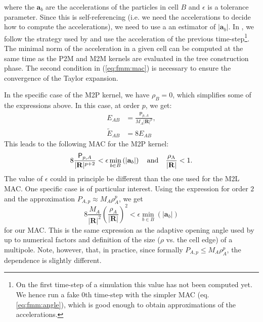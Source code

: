 where the $\mathbf{a}_b$ are the accelerations of the particles in cell $B$
and $\epsilon$ is a tolerance parameter. Since this is self-referencing
(i.e. we need the accelerations to decide how to compute the
accelerations), we need to use a an estimator of $|\mathbf{a}_b|$. In
\swift, we follow the strategy used by \gadget and use the acceleration of
the previous time-step\footnote{On the first time-step of a simulation this
  value has not been computed yet. We hence run a fake 0th time-step with
  the simpler MAC (eq. \ref{eq:fmm:angle}), which is good enough to obtain
  approximations of the accelerations.}. The minimal norm of the
acceleration in a given cell can be computed at the same time as the P2M
and M2M kernels are evaluated in the tree construction phase. The second
condition in (\ref{eq:fmm:mac}) is necessary to ensure the convergence of the
Taylor expansion.

In the specific case of the M2P kernel, we have $\rho_B = 0$, which
simplifies some of the expressions above. In this case, at order $p$, we get:
\begin{align}
  E_{AB} &= \frac{\mathsf{P}_{p, A}}{M_A |\mathbf{R}|^p}, \nonumber \\
  \tilde{E}_{AB} &= 8E_{AB} \nonumber 
\end{align}
This leads to the following MAC for the M2P kernel:
\begin{equation}
  8\frac{\mathsf{P}_{p, A}}{|\mathbf{R}|^{p+2}} < \epsilon \min_{b\in
    B}\left(|\mathbf{a}_b|\right) \quad \rm{and} \quad \frac{\rho_A}
  {|\mathbf{R}|} < 1.
    \label{eq:fmm:mac_m2p}  
\end{equation}
The value of $\epsilon$ could in principle be different than the one
used for the M2L MAC. One specific case is of particular
interest. Using the expression for order $2$ and the approximation
$P_{A,p} \approx M_A \rho_A^p$, we get
\begin{equation}
  8\frac{M_A}{|\mathbf{R}|^2}\left(\frac{\rho_A}{|\mathbf{R}|}\right)^2
  < \epsilon \min_{b\in B}\left(|\mathbf{a}_b|\right) \nonumber
\end{equation}
for our MAC.  This is the same expression as the adaptive opening
angle used by \gadget \cite[see eq.18 of][]{Springel2005} up to
numerical factors and definition of the size ($\rho$ vs. the cell
edge) of a multipole. Note, however, that, in practice, since formally
$P_{A,p} \leq M_A \rho_A^p$, the dependence is slightly different.


